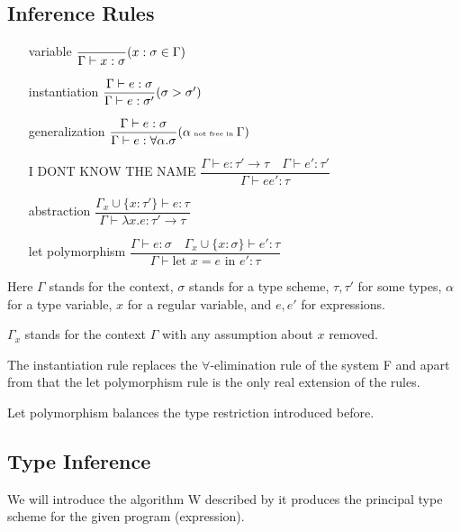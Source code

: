 \subsection{Inference Rules}

\begin{itemize}
    \item[variable] $\dfrac{}{\Gamma \vdash x : \sigma}\tiny{(x : \sigma \in \Gamma)}$
    \item[instantiation] $\dfrac{\Gamma \vdash e : \sigma}{\Gamma \vdash e : \sigma'}\tiny{(\sigma > \sigma')}$
    \item[generalization] $\dfrac{\Gamma \vdash e : \sigma}{\Gamma \vdash e : \forall \alpha . \sigma}\tiny{(\alpha \text{ not free in }\Gamma)}$
    \item[I DONT KNOW THE NAME] $\dfrac{\Gamma \vdash e : \tau' \rightarrow \tau \quad \Gamma \vdash e' : \tau' }{\Gamma \vdash e e' : \tau}$ %
    \item[abstraction] $\dfrac{\Gamma_x \cup \{x : \tau'\} \vdash e : \tau}{\Gamma \vdash \lambda x . e : \tau' \rightarrow \tau}$
    \item[let polymorphism] $\dfrac{\Gamma \vdash e : \sigma \quad \Gamma_x \cup \{x :\sigma\} \vdash e' : \tau}{\Gamma \vdash \text{let } x = e \text{ in } e' : \tau}$
\end{itemize}

Here $\Gamma$ stands for the context, $\sigma$ stands for a type scheme, $\tau, \tau'$ for some types, $\alpha$ for a type variable, $x$ for a regular variable, and $e, e'$ for expressions.

$\Gamma_x$ stands for the context $\Gamma$ with any assumption about $x$ removed.

The instantiation rule replaces the $\forall$-elimination rule of the system F and apart from that the let polymorphism rule is the only real extension of the rules.

Let polymorphism balances the type restriction introduced before.

\subsection{Type Inference}

We will introduce the algorithm W described by %
it produces the principal type scheme for the given program (expression).

